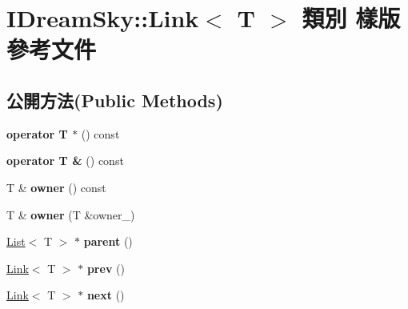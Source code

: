 \hypertarget{class_i_dream_sky_1_1_link}{}\section{I\+Dream\+Sky\+:\+:Link$<$ T $>$ 類別 樣版 參考文件}
\label{class_i_dream_sky_1_1_link}
\subsection*{公開方法(Public Methods)}
\begin{DoxyCompactItemize}
\item 
{\bfseries operator T $\ast$} () const \hypertarget{class_i_dream_sky_1_1_link_a8898cb9ab546270f106643950cfe2cc2}{}\label{class_i_dream_sky_1_1_link_a8898cb9ab546270f106643950cfe2cc2}

\item 
{\bfseries operator T \&} () const \hypertarget{class_i_dream_sky_1_1_link_ae793db3a74f26f3e9480b4b9f829b61c}{}\label{class_i_dream_sky_1_1_link_ae793db3a74f26f3e9480b4b9f829b61c}

\item 
T \& {\bfseries owner} () const \hypertarget{class_i_dream_sky_1_1_link_a6aa8b41b815c547b78186c1497907ed2}{}\label{class_i_dream_sky_1_1_link_a6aa8b41b815c547b78186c1497907ed2}

\item 
T \& {\bfseries owner} (T \&owner\+\_\+)\hypertarget{class_i_dream_sky_1_1_link_a87a4c7c9abe772c93fb77508bc33af37}{}\label{class_i_dream_sky_1_1_link_a87a4c7c9abe772c93fb77508bc33af37}

\item 
\hyperlink{class_i_dream_sky_1_1_list}{List}$<$ T $>$ $\ast$ {\bfseries parent} ()\hypertarget{class_i_dream_sky_1_1_link_ab005cabf750c741b84ac06ada8c59ebe}{}\label{class_i_dream_sky_1_1_link_ab005cabf750c741b84ac06ada8c59ebe}

\item 
\hyperlink{class_i_dream_sky_1_1_link}{Link}$<$ T $>$ $\ast$ {\bfseries prev} ()\hypertarget{class_i_dream_sky_1_1_link_a72ef6cdbc9e33b5082565fe2fdcb4d0a}{}\label{class_i_dream_sky_1_1_link_a72ef6cdbc9e33b5082565fe2fdcb4d0a}

\item 
\hyperlink{class_i_dream_sky_1_1_link}{Link}$<$ T $>$ $\ast$ {\bfseries next} ()\hypertarget{class_i_dream_sky_1_1_link_a6e86e59ec43841b0b5efb26f9b5914f7}{}\label{class_i_dream_sky_1_1_link_a6e86e59ec43841b0b5efb26f9b5914f7}


\end{DoxyCompactItemize}
